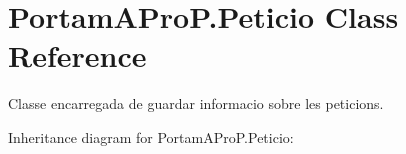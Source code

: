 \hypertarget{class_portam_a_pro_p_1_1_peticio}{}\section{Portam\+A\+Pro\+P.\+Peticio Class Reference}
\label{class_portam_a_pro_p_1_1_peticio}


Classe encarregada de guardar informacio sobre les peticions.  




Inheritance diagram for Portam\+A\+Pro\+P.\+Peticio\+:
